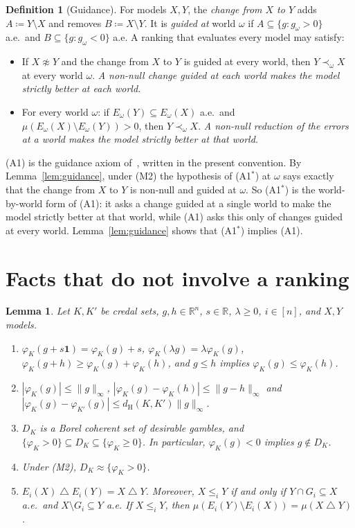 \documentclass[11pt]{article}
\newtheorem{lemma}[theorem]{Lemma}
\theoremstyle{definition}
\newtheorem{definition}[theorem]{Definition}
\newcommand{\R}{\mathbb R}
\newcommand{\one}{\mathbf 1}
\newcommand{\dH}{d_{\mathrm H}}
\newcommand{\sd}{\mathbin{\triangle}}
\begin{document}
\begin{definition}[Guidance]\label{def:guidance}
For models $X,Y$, the \emph{change from $X$ to $Y$} adds $A\coloneqq Y\setminus X$ and removes $B\coloneqq X\setminus Y$. It is \emph{guided at} world $\omega$ if $A\subseteq\{g:g_\omega>0\}$ a.e.\ and $B\subseteq\{g:g_\omega<0\}$ a.e. A ranking that evaluates every model may satisfy:
\begin{itemize}[leftmargin=3.2em]
\item[(A1)] If $X\not\approx Y$ and the change from $X$ to $Y$ is guided at every world, then $Y\prec_\omega X$ at every world $\omega$. \emph{A non-null change guided at each world makes the model strictly better at each world.}
\item[(A1$^*$)] For every world $\omega$: if $E_\omega(Y)\subseteq E_\omega(X)$ a.e.\ and $\mu(E_\omega(X)\setminus E_\omega(Y))>0$, then $Y\prec_\omega X$. \emph{A non-null reduction of the errors at a world makes the model strictly better at that world.}
\end{itemize}
\end{definition}

(A1) is the guidance axiom of~\cite{App}, written in the present convention. By Lemma~\ref{lem:guidance}, under (M2) the hypothesis of (A1$^*$) at $\omega$ says exactly that the change from $X$ to $Y$ is non-null and guided at $\omega$. So (A1$^*$) is the world-by-world form of (A1): it asks a change guided at a single world to make the model strictly better at that world, while (A1) asks this only of changes guided at every world. Lemma~\ref{lem:guidance} shows that (A1$^*$) implies (A1).

\section{Facts that do not involve a ranking}\label{sec:facts}

\begin{lemma}\label{lem:F}
Let $K,K'$ be credal sets, $g,h\in\R^n$, $s\in\R$, $\lambda\ge0$, $i\in[n]$, and $X,Y$ models.
\begin{enumerate}[label=(F\arabic*),leftmargin=3em]
\item $\varphi_K(g+s\one)=\varphi_K(g)+s$, $\varphi_K(\lambda g)=\lambda\varphi_K(g)$, $\varphi_K(g+h)\ge\varphi_K(g)+\varphi_K(h)$, and $g\le h$ implies $\varphi_K(g)\le\varphi_K(h)$.
\item $|\varphi_K(g)|\le\|g\|_\infty$, $|\varphi_K(g)-\varphi_K(h)|\le\|g-h\|_\infty$ and $|\varphi_K(g)-\varphi_{K'}(g)|\le\dH(K,K')\|g\|_\infty$.
\item $D_K$ is a Borel coherent set of desirable gambles, and $\{\varphi_K>0\}\subseteq D_K\subseteq\{\varphi_K\ge0\}$. In particular, $\varphi_K(g)<0$ implies $g\notin D_K$.
\item Under (M2), $D_K\approx\{\varphi_K>0\}$.
\item $E_i(X)\sd E_i(Y)=X\sd Y$. Moreover, $X\le_iY$ if and only if $Y\cap G_i\subseteq X$ a.e.\ and $X\setminus G_i\subseteq Y$ a.e. If $X\le_iY$, then $\mu(E_i(Y)\setminus E_i(X))=\mu(X\sd Y)$.
\end{enumerate}
\end{lemma}
\end{document}
